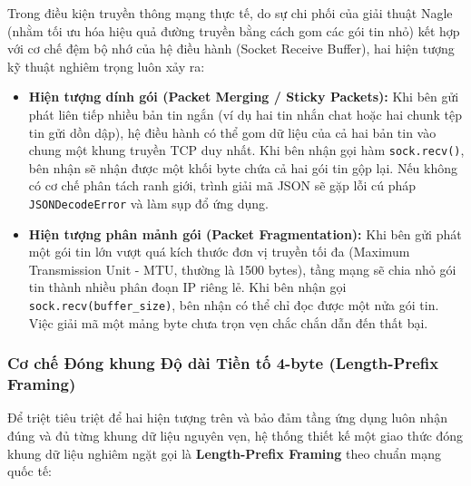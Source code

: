 \documentclass[a4paper,12pt]{article}
\begin{document}
Trong điều kiện truyền thông mạng thực tế, do sự chi phối của giải thuật Nagle (nhằm tối ưu hóa hiệu quả đường truyền bằng cách gom các gói tin nhỏ) kết hợp với cơ chế đệm bộ nhớ của hệ điều hành (Socket Receive Buffer), hai hiện tượng kỹ thuật nghiêm trọng luôn xảy ra:
\begin{itemize}
    \item \textbf{Hiện tượng dính gói (Packet Merging / Sticky Packets):} Khi bên gửi phát liên tiếp nhiều bản tin ngắn (ví dụ hai tin nhắn chat hoặc hai chunk tệp tin gửi dồn dập), hệ điều hành có thể gom dữ liệu của cả hai bản tin vào chung một khung truyền TCP duy nhất. Khi bên nhận gọi hàm \texttt{sock.recv()}, bên nhận sẽ nhận được một khối byte chứa cả hai gói tin gộp lại. Nếu không có cơ chế phân tách ranh giới, trình giải mã JSON sẽ gặp lỗi cú pháp \texttt{JSONDecodeError} và làm sụp đổ ứng dụng.
    \item \textbf{Hiện tượng phân mảnh gói (Packet Fragmentation):} Khi bên gửi phát một gói tin lớn vượt quá kích thước đơn vị truyền tối đa (Maximum Transmission Unit - MTU, thường là 1500 bytes), tầng mạng sẽ chia nhỏ gói tin thành nhiều phân đoạn IP riêng lẻ. Khi bên nhận gọi \texttt{sock.recv(buffer\_size)}, bên nhận có thể chỉ đọc được một nửa gói tin. Việc giải mã một mảng byte chưa trọn vẹn chắc chắn dẫn đến thất bại.
\end{itemize}

\subsubsection{Cơ chế Đóng khung Độ dài Tiền tố 4-byte (Length-Prefix Framing)}
Để triệt tiêu triệt để hai hiện tượng trên và bảo đảm tầng ứng dụng luôn nhận đúng và đủ từng khung dữ liệu nguyên vẹn, hệ thống thiết kế một giao thức đóng khung dữ liệu nghiêm ngặt gọi là \textbf{Length-Prefix Framing} theo chuẩn mạng quốc tế:
\end{document}
